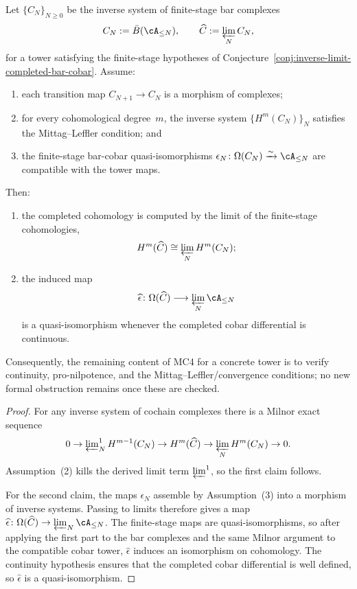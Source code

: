 \begin{proposition}
\label{prop:mc4-reduction-principle}
Let $\{C_N\}_{N \ge 0}$ be the inverse system of finite-stage bar
complexes
\[
C_N := \bar B(\cA_{\le N}),
\qquad
\widehat{C} := \varprojlim_N C_N,
\]
for a tower satisfying the finite-stage hypotheses of
Conjecture~\ref{conj:inverse-limit-completed-bar-cobar}.  Assume:
\begin{enumerate}
\item each transition map $C_{N+1} \to C_N$ is a morphism of complexes;
\item for every cohomological degree~$m$, the inverse system
  $\{H^m(C_N)\}_N$ satisfies the Mittag--Leffler condition; and
\item the finite-stage bar-cobar quasi-isomorphisms
  $\epsilon_N \colon \Omega(C_N) \xrightarrow{\sim} \cA_{\le N}$ are
  compatible with the tower maps.
\end{enumerate}
Then:
\begin{enumerate}
\item the completed cohomology is computed by the limit of the
  finite-stage cohomologies,
  \[
  H^m(\widehat{C}) \cong \varprojlim_N H^m(C_N);
  \]
\item the induced map
  \[
  \widehat{\epsilon}\colon \Omega(\widehat{C}) \longrightarrow
  \varprojlim_N \cA_{\le N}
  \]
  is a quasi-isomorphism whenever the completed cobar differential is
  continuous.
\end{enumerate}
Consequently, the remaining content of MC4 for a concrete tower is to
verify continuity, pro-nilpotence, and the Mittag--Leffler/convergence
conditions; no new formal obstruction remains once these are checked.
\end{proposition}

\begin{proof}
For any inverse system of cochain complexes there is a Milnor exact
sequence
\[
0 \to \varprojlim\nolimits^1_N H^{m-1}(C_N)
\to H^m(\widehat{C})
\to \varprojlim_N H^m(C_N) \to 0.
\]
Assumption~\textup{(2)} kills the derived limit term
$\varprojlim^1$, so the first claim follows.

For the second claim, the maps $\epsilon_N$ assemble by
Assumption~\textup{(3)} into a morphism of inverse systems.  Passing to
limits therefore gives a map
$\widehat{\epsilon}\colon \Omega(\widehat{C}) \to \varprojlim_N \cA_{\le N}$.
The finite-stage maps are quasi-isomorphisms, so after applying the
first part to the bar complexes and the same Milnor argument to the
compatible cobar tower, $\widehat{\epsilon}$ induces an isomorphism on
cohomology.  The continuity hypothesis ensures that the completed cobar
differential is well defined, so $\widehat{\epsilon}$ is a
quasi-isomorphism.
\end{proof}

